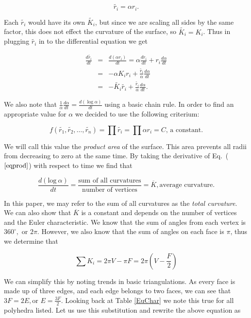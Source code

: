 \documentclass[12pt]{article}
\begin{document}
$$ \tilde{r_i} = \alpha r_i. $$ 
 
\noindent Each $\tilde{r_i}$ would have its own $\tilde{K_i}$, but since we are scaling all sides by the same factor, this does not effect the curvature of the surface, so $\tilde{K_i} = K_i$. Thus in plugging $\tilde{r_i}$ in to the differential equation we get
 
 \begin{eqnarray}
 \label{ref1}
 \frac{d\tilde{r_i}}{dt} &=& \frac{d(\alpha r_i)}{dt} = \alpha \frac{dr_i}{dt} + r_i\frac{d\alpha}{dt}\nonumber\\
 &=& -\alpha K_ir_i + \frac{\tilde{r_i}}{\alpha}\frac{d\alpha}{dt} \nonumber \\
 &=& -\tilde{K_i}\tilde{r_i} + \frac{\tilde{r_i}}{\alpha}\frac{d\alpha}{dt}.
 \end{eqnarray}
 
\noindent We also note that $\displaystyle \frac{1}{\alpha} \frac{d\alpha}{dt} = \frac{d(\log \alpha)}{dt}$ using a basic chain rule. In order to find an appropriate value for $\alpha$ we decided to use the following criterium:
 
\begin{equation}
\label{eqprod}
f(\tilde{r_1},\tilde{r_2},\ldots,\tilde{r_n}) = \prod{\tilde{r_i}} = \prod{\alpha r_i} = C\mbox{, a constant.}
\end{equation}

\noindent We will call this value the \textit{product area} of the surface. This area prevents all radii from decreasing to zero at the same time. By taking the derivative of Eq.~($\ref{eqprod}$) with respect to time we find that 
 
\begin{equation}
\label{proof1}
\frac{d(\mbox{log}~\alpha)}{dt} = \frac{\mbox{sum of all curvatures}}{\mbox{number of vertices}} = \overline{K}, \mbox{average curvature.}
\end{equation}

\noindent In this paper, we may refer to the sum of all curvatures as the \textit{total curvature}. We can also show that $\overline{K}$ is a constant and depends on the number of vertices and the Euler characteristic. We know that the sum of angles from each vertex is $360^\circ,$ or $2\pi$. However, we also know that the sum of angles on each face is $\pi$, thus we determine that 

$$\sum{K_i} = 2\pi V - \pi F = 2\pi(V - \frac{F}{2})$$

\noindent We can simplify this by noting trends in basic triangulations. As every face is made up of three edges, and each edge belongs to two faces, we can see that $3F = 2E, \mbox{or } E = \frac{3F}{2}$. Looking back at Table \ref{EuChar} we note this true for all polyhedra listed. Let us use this substitution and rewrite the above equation as
\end{document}
